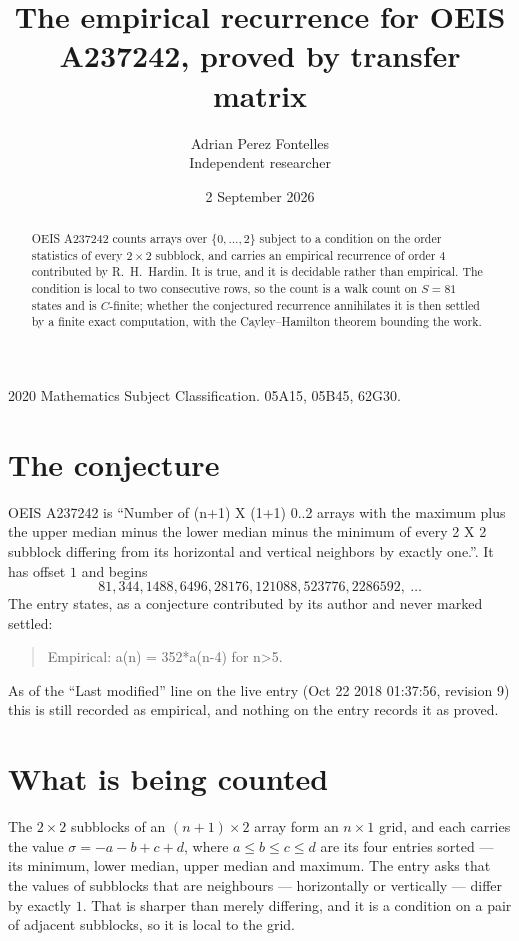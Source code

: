 \documentclass[11pt,a4paper]{article}
\title{The empirical recurrence for OEIS A237242, proved by transfer matrix}
\author{Adrian Perez Fontelles\\ \small Independent researcher}
\date{2 September 2026}
\theoremstyle{plain}
\theoremstyle{definition}
\begin{document}
\maketitle

\begin{abstract}
OEIS A237242 counts arrays over $\{0,\dots,2\}$ subject to a condition on the order
statistics of every $2\times2$ subblock, and carries an empirical recurrence of order
$4$ contributed by R.~H.~Hardin. It is true, and it is decidable rather than empirical.
The condition is local to two consecutive rows, so the count is a walk count on $S=81$
states and is $C$-finite; whether the conjectured recurrence annihilates it is then settled by
a finite exact computation, with the Cayley--Hamilton theorem bounding the work.
\end{abstract}

\noindent\small 2020 Mathematics Subject Classification. 05A15, 05B45, 62G30.\normalsize

\section{The conjecture}

OEIS A237242 is ``Number of (n+1) X (1+1) 0..2 arrays with the maximum plus the upper median minus the lower median minus the minimum of every 2 X 2 subblock differing from its horizontal and vertical neighbors by exactly one.''. It has offset $1$ and begins
\[
81, 344, 1488, 6496, 28176, 121088, 523776, 2286592,\ \dots
\]
The entry states, as a conjecture contributed by its author and never marked settled:
\begin{quote}
Empirical: a(n) = 352*a(n-4) for n>5.
\end{quote}
As of the ``Last modified'' line on the live entry (Oct 22 2018 01:37:56, revision 9) this is still
recorded as empirical, and nothing on the entry records it as proved.

\section{What is being counted}

The $2\times2$ subblocks of an $(n+1)\times2$ array form an
$n\times1$ grid, and each carries the value $\sigma=-a-b+c+d$, where $a\le b\le c\le d$ are its four entries sorted --- its minimum, lower median, upper median and maximum. The entry asks that the values of
subblocks that are neighbours --- horizontally or vertically --- differ by exactly $1$.
That is sharper than merely differing, and it is a condition on a pair of adjacent subblocks,
so it is local to the grid.
\end{document}
